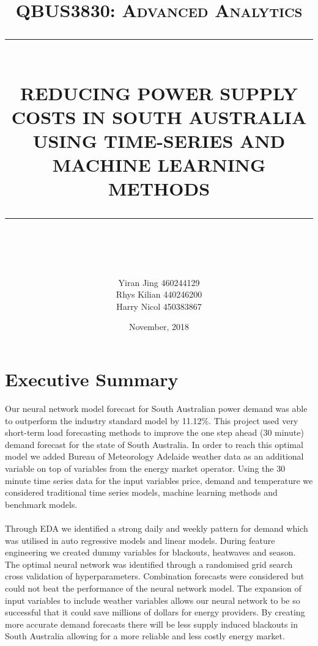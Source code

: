 \documentclass[11pt]{article}
\newcommand{\HRule}[1]{\rule{\linewidth}{#1}}
\begin{document}
\title{ \normalsize \textsc{QBUS3830: Advanced Analytics}
		\\ [2.0cm]
		\HRule{0.5pt} \\
		\LARGE \textbf{\uppercase{Reducing Power Supply Costs in South Australia using Time-Series and Machine Learning Methods}}
		\HRule{2pt} \\ [0.5cm]
		\normalsize \vspace*{5\baselineskip}}
\date{November, 2018}
\author{Yiran Jing 460244129\\ Rhys Kilian 440246200\\Harry Nicol 450383867\\}
\maketitle

\newpage
\thispagestyle{empty}
\section*{Executive Summary}

Our neural network model forecast for South Australian power demand was able to outperform the industry standard model by 11.12\%. This project used very short-term load forecasting methods to improve the one step ahead (30 minute) demand forecast for the state of South Australia. In order to reach this optimal model we added Bureau of Meteorology Adelaide weather data as an additional variable on top of variables from the energy market operator. Using the 30 minute time series data for the input variables price, demand and temperature we considered traditional time series models, machine learning methods and benchmark models. 
\\
\\
Through EDA we identified a strong daily and weekly pattern for demand which was utilised in auto regressive models and linear models. During feature engineering we created dummy variables for blackouts, heatwaves and season. The optimal neural network was identified through a randomised grid search cross validation of hyperparameters. Combination forecasts were considered but could not beat the performance of the neural network model. The expansion of input variables to include weather variables allows our neural network to be so successful that it could save millions of dollars for energy providers. By creating more accurate demand forecasts there will be less supply induced blackouts in South Australia allowing for a more reliable and less costly energy market.
\end{document}
